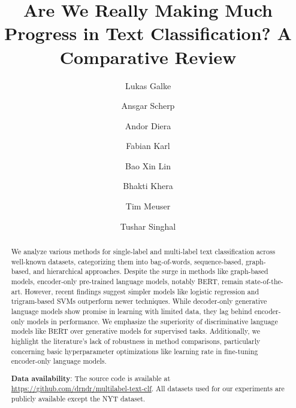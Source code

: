 \documentclass[acmsmall,nonacm]{acmart}
\begin{document}
\title{Are We Really Making Much Progress in Text Classification? A Comparative Review}


\author{Lukas Galke}

\author{Ansgar Scherp}

\author{Andor Diera}

\author{Fabian Karl}

\author{Bao Xin Lin}

\author{Bhakti Khera}

\author{Tim Meuser}

\author{Tushar Singhal}

\begin{abstract}

We analyze various methods for single-label and multi-label text classification across well-known datasets, categorizing them into bag-of-words, sequence-based, graph-based, and hierarchical approaches. 
Despite the surge in methods like graph-based models, encoder-only pre-trained language models, notably BERT, remain state-of-the-art. 
However, recent findings suggest simpler models like logistic regression and trigram-based SVMs outperform newer techniques. 
While decoder-only generative language models show promise in learning with limited data, they lag behind encoder-only models in performance. 
We emphasize the superiority of discriminative language models like BERT over generative models for supervised tasks. 
Additionally, we highlight the literature's lack of robustness in method comparisons, particularly concerning basic hyperparameter optimizations like learning rate in fine-tuning encoder-only language models.

\noindent \textbf{Data availability}: The source code is available at \url{https://github.com/drndr/multilabel-text-clf}. All datasets used for our experiments are publicly available except the NYT dataset.

\end{abstract}
\end{document}
